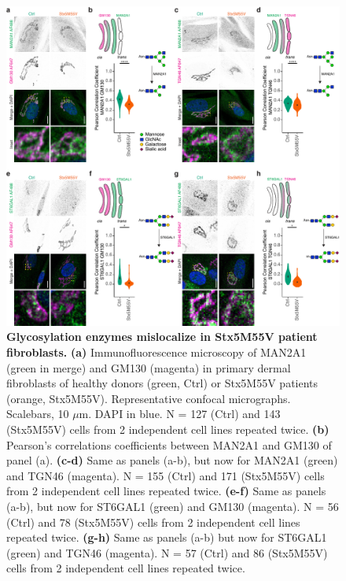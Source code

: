 \begin{figure}
    \includegraphics[keepaspectratio=true,width=\textwidth,height=\textheight]{chapters/chapter6/chapter6_SupplementaryFigure6.pdf}
    \caption{\textbf{Glycosylation enzymes mislocalize in Stx5M55V patient fibroblasts.} \textbf{(a)} Immunofluorescence microscopy of MAN2A1 (green in merge) and GM130 (magenta) in primary dermal fibroblasts of healthy donors (green, Ctrl) or Stx5M55V patients (orange, Stx5M55V). Representative confocal micrographs. Scalebars, 10 $\mu$m. DAPI in blue. N = 127 (Ctrl) and 143 (Stx5M55V) cells from 2 independent cell lines repeated twice. \textbf{(b)} Pearson's correlations coefficients between MAN2A1 and GM130 of panel (a). \textbf{(c-d)} Same as panels (a-b), but now for MAN2A1 (green) and TGN46 (magenta). N = 155 (Ctrl) and 171 (Stx5M55V) cells from 2 independent cell lines repeated twice. \textbf{(e-f)} Same as panels (a-b), but now for ST6GAL1 (green) and GM130 (magenta). N = 56 (Ctrl) and 78 (Stx5M55V) cells from 2 independent cell lines repeated twice. \textbf{(g-h)} Same as panels (a-b) but now for ST6GAL1 (green) and TGN46 (magenta). N = 57 (Ctrl) and 86 (Stx5M55V) cells from 2 independent cell lines repeated twice.}
    \label{fig:ch6supfig6}
\end{figure}

\clearpage

